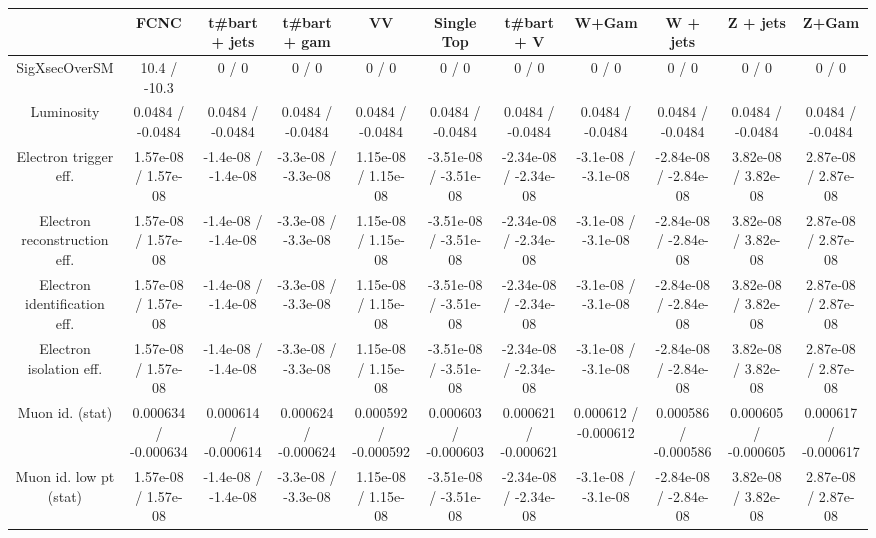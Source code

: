 \begin{table}[htbp]
\begin{center}
\footnotesize
\begin{tabular}{|c|c|c|c|c|c|c|c|c|c|c|}
\hline 
      & FCNC      & t#bar{t} + jets      & t#bar{t} +  gam      & VV      & Single Top      & t#bar{t} + V      & W+Gam      & W + jets      & Z + jets      & Z+Gam \\ 
\hline 
 SigXsecOverSM & 10.4 / -10.3 & 0 / 0 & 0 / 0 & 0 / 0 & 0 / 0 & 0 / 0 & 0 / 0 & 0 / 0 & 0 / 0 & 0 / 0 \\ 
  Luminosity & 0.0484 / -0.0484 & 0.0484 / -0.0484 & 0.0484 / -0.0484 & 0.0484 / -0.0484 & 0.0484 / -0.0484 & 0.0484 / -0.0484 & 0.0484 / -0.0484 & 0.0484 / -0.0484 & 0.0484 / -0.0484 & 0.0484 / -0.0484 \\ 
  Electron trigger eff. & 1.57e-08 / 1.57e-08 & -1.4e-08 / -1.4e-08 & -3.3e-08 / -3.3e-08 & 1.15e-08 / 1.15e-08 & -3.51e-08 / -3.51e-08 & -2.34e-08 / -2.34e-08 & -3.1e-08 / -3.1e-08 & -2.84e-08 / -2.84e-08 & 3.82e-08 / 3.82e-08 & 2.87e-08 / 2.87e-08 \\ 
  Electron reconstruction eff. & 1.57e-08 / 1.57e-08 & -1.4e-08 / -1.4e-08 & -3.3e-08 / -3.3e-08 & 1.15e-08 / 1.15e-08 & -3.51e-08 / -3.51e-08 & -2.34e-08 / -2.34e-08 & -3.1e-08 / -3.1e-08 & -2.84e-08 / -2.84e-08 & 3.82e-08 / 3.82e-08 & 2.87e-08 / 2.87e-08 \\ 
  Electron identification eff. & 1.57e-08 / 1.57e-08 & -1.4e-08 / -1.4e-08 & -3.3e-08 / -3.3e-08 & 1.15e-08 / 1.15e-08 & -3.51e-08 / -3.51e-08 & -2.34e-08 / -2.34e-08 & -3.1e-08 / -3.1e-08 & -2.84e-08 / -2.84e-08 & 3.82e-08 / 3.82e-08 & 2.87e-08 / 2.87e-08 \\ 
  Electron isolation eff. & 1.57e-08 / 1.57e-08 & -1.4e-08 / -1.4e-08 & -3.3e-08 / -3.3e-08 & 1.15e-08 / 1.15e-08 & -3.51e-08 / -3.51e-08 & -2.34e-08 / -2.34e-08 & -3.1e-08 / -3.1e-08 & -2.84e-08 / -2.84e-08 & 3.82e-08 / 3.82e-08 & 2.87e-08 / 2.87e-08 \\ 
  Muon id. (stat) & 0.000634 / -0.000634 & 0.000614 / -0.000614 & 0.000624 / -0.000624 & 0.000592 / -0.000592 & 0.000603 / -0.000603 & 0.000621 / -0.000621 & 0.000612 / -0.000612 & 0.000586 / -0.000586 & 0.000605 / -0.000605 & 0.000617 / -0.000617 \\ 
  Muon id. low pt (stat) & 1.57e-08 / 1.57e-08 & -1.4e-08 / -1.4e-08 & -3.3e-08 / -3.3e-08 & 1.15e-08 / 1.15e-08 & -3.51e-08 / -3.51e-08 & -2.34e-08 / -2.34e-08 & -3.1e-08 / -3.1e-08 & -2.84e-08 / -2.84e-08 & 3.82e-08 / 3.82e-08 & 2.87e-08 / 2.87e-08 \\ 

\end{tabular}
\end{center}
\end{table}
